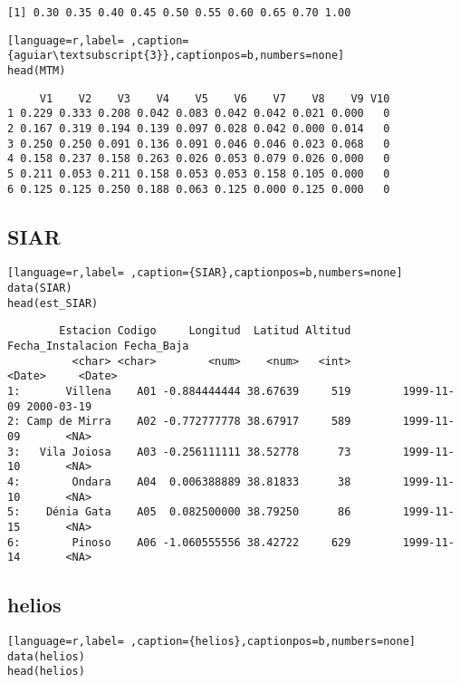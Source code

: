 \begin{verbatim}
[1] 0.30 0.35 0.40 0.45 0.50 0.55 0.60 0.65 0.70 1.00
\end{verbatim}


\begin{lstlisting}[language=r,label= ,caption={aguiar\textsubscript{3}},captionpos=b,numbers=none]
head(MTM)
\end{lstlisting}

\begin{verbatim}
     V1    V2    V3    V4    V5    V6    V7    V8    V9 V10
1 0.229 0.333 0.208 0.042 0.083 0.042 0.042 0.021 0.000   0
2 0.167 0.319 0.194 0.139 0.097 0.028 0.042 0.000 0.014   0
3 0.250 0.250 0.091 0.136 0.091 0.046 0.046 0.023 0.068   0
4 0.158 0.237 0.158 0.263 0.026 0.053 0.079 0.026 0.000   0
5 0.211 0.053 0.211 0.158 0.053 0.053 0.158 0.105 0.000   0
6 0.125 0.125 0.250 0.188 0.063 0.125 0.000 0.125 0.000   0
\end{verbatim}

\subsection{SIAR}
\label{sec:orgeb2cc28}
\label{subsec:siar}
\begin{lstlisting}[language=r,label= ,caption={SIAR},captionpos=b,numbers=none]
data(SIAR)
head(est_SIAR)
\end{lstlisting}

\begin{verbatim}
        Estacion Codigo     Longitud  Latitud Altitud Fecha_Instalacion Fecha_Baja
          <char> <char>        <num>    <num>   <int>            <Date>     <Date>
1:       Villena    A01 -0.884444444 38.67639     519        1999-11-09 2000-03-19
2: Camp de Mirra    A02 -0.772777778 38.67917     589        1999-11-09       <NA>
3:   Vila Joiosa    A03 -0.256111111 38.52778      73        1999-11-10       <NA>
4:        Ondara    A04  0.006388889 38.81833      38        1999-11-10       <NA>
5:    Dénia Gata    A05  0.082500000 38.79250      86        1999-11-15       <NA>
6:        Pinoso    A06 -1.060555556 38.42722     629        1999-11-14       <NA>
\end{verbatim}

\subsection{helios}
\label{sec:org26295d3}
\label{subsec:helios}
\begin{lstlisting}[language=r,label= ,caption={helios},captionpos=b,numbers=none]
data(helios)
head(helios)
\end{lstlisting}

